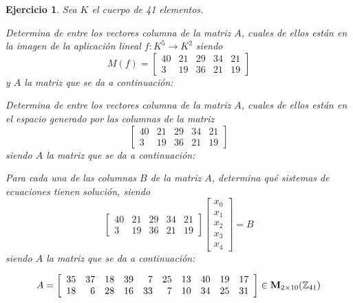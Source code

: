 \documentclass[12pt]{amsart}
\newtheorem{ejer}{Ejercicio}
\begin{document}
\begin{ejer} Sea $K$ el cuerpo de 41 elementos.
\newline
\noindent\begin{minipage}{\textwidth}
\begin{tcolorbox}[colback = green!20!white,title=Versión Núcleo]
Determina de entre los vectores columna de la matriz $A$, cuales de ellos están en la imagen de la aplicación lineal $f:K^{5} \to K^{2}$ siendo  $$ M(f) = \left[\begin{array}{rrrrr}
40 & 21 & 29 & 34 & 21 \\
3 & 19 & 36 & 21 & 19
\end{array}\right] $$ y $A$ la matriz que se da a continuación:\end{tcolorbox}
\end{minipage} \newline
\noindent\begin{minipage}{\textwidth}
\begin{tcolorbox}[colback = blue!20!white,title=Versión Anulador]
Determina de entre los vectores columna de la matriz $A$, cuales de ellos están en el espacio generado por las columnas de la matriz $$ \left[\begin{array}{rrrrr}
40 & 21 & 29 & 34 & 21 \\
3 & 19 & 36 & 21 & 19
\end{array}\right] $$ siendo $A$ la matriz que se da a continuación:\end{tcolorbox}
\end{minipage} \newline
\noindent\begin{minipage}{\textwidth} 
\begin{tcolorbox}[colback = red!20!white,title=Versión Ecuaciones Implícitas]
Para cada una de las columnas $B$ de la matriz $A$, determina qué sistemas de ecuaciones tienen solución, siendo $$ \left[\begin{array}{rrrrr}
40 & 21 & 29 & 34 & 21 \\
3 & 19 & 36 & 21 & 19
\end{array}\right] \left[\begin{array}{r}
x_{0} \\
x_{1} \\
x_{2} \\
x_{3} \\
x_{4}
\end{array}\right] = B$$ siendo $A$ la matriz que se da a continuación:
\end{tcolorbox}
\end{minipage}
\[ A = \left[\begin{array}{rrrrrrrrrr}
35 & 37 & 18 & 39 & 7 & 25 & 13 & 40 & 19 & 17 \\
18 & 6 & 28 & 16 & 33 & 7 & 10 & 34 & 25 & 31
\end{array}\right] \in {\bf M}_{2\times 10}({\mathbb Z}_{41})\]
\end{ejer}
\end{document}
